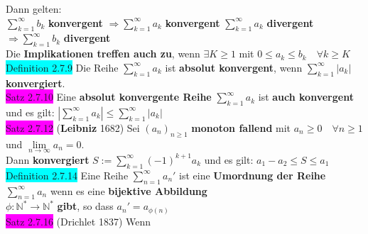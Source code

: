 \documentclass[10pt]{article}
\begin{document}
                Dann gelten: \\
        \indent \textcolor{NavyBlue}{$\sum_{k=1}^\infty b_k$} \textbf{konvergent} 
                \textcolor{NavyBlue}{$\Longrightarrow \sum_{k=1}^\infty a_k$} 
                \textbf{konvergent}
                \qquad \textcolor{NavyBlue}{$\sum_{k=1}^\infty a_k$} \textbf{divergent} 
                \textcolor{NavyBlue}{$\Longrightarrow \sum_{k=1}^\infty b_k$} 
                \textbf{divergent} \\
        \indent Die \textbf{Implikationen treffen auch zu}, wenn 
                \textcolor{NavyBlue}{$\exists K\geqslant1$} mit 
                \textcolor{NavyBlue}{$0\leqslant a_k\leqslant b_k\quad\forall k\geqslant K$}\\
\colorbox{cyan}{Definition 2.7.9} Die Reihe \textcolor{NavyBlue}{$\sum_{k=1}^\infty a_k$} ist 
                \textbf{absolut konvergent}, 
                wenn \textcolor{NavyBlue}{$\sum_{k=1}^\infty |a_k|$} 
                \textbf{konvergiert}.\\
\colorbox{magenta}{Satz 2.7.10} Eine \textbf{absolut konvergente Reihe} 
                \textcolor{NavyBlue}{$\sum_{k=1}^\infty a_k$}
                ist \textbf{auch konvergent} und es gilt:
                \textcolor{NavyBlue}{$|\sum_{k=1}^\infty a_k|\leqslant\sum_{k=1}^\infty |a_k|$}\\
\colorbox{magenta}{Satz 2.7.12} (\textbf{Leibniz} 1682) Sei 
                \textcolor{NavyBlue}{$(a_n)_{n\geqslant1}$}
                \textbf{monoton fallend} 
                mit \textcolor{NavyBlue}{$a_n\geqslant0\quad\forall n\geqslant1$} und 
                \textcolor{NavyBlue}{$\lim\limits_{n\to\infty}a_n=0$}. \\
        \indent Dann \textbf{konvergiert} 
                \textcolor{NavyBlue}{$S:=\sum_{k=1}^\infty (-1)^{k+1}a_k$} und es gilt: 
                \textcolor{NavyBlue}{$a_1-a_2\leqslant S\leqslant a_1$}\\
\colorbox{cyan}{Definition 2.7.14} Eine Reihe \textcolor{NavyBlue}{$\sum_{n=1}^\infty a_n'$} 
                ist eine 
                \textbf{Umordnung der Reihe} \textcolor{NavyBlue}{$\sum_{n=1}^\infty a_n$} 
                wenn es eine \textbf{bijektive Abbildung} \\
        \indent \textcolor{NavyBlue}{$\phi :\mathbb{N}^*\longrightarrow\mathbb{N}^*$} 
                \textbf{gibt}, so dass 
                \textcolor{NavyBlue}{$a_n'=a_{\phi(n)}$}\\
\colorbox{magenta}{Satz 2.7.16} (Drichlet 1837) Wenn 
\end{document}
